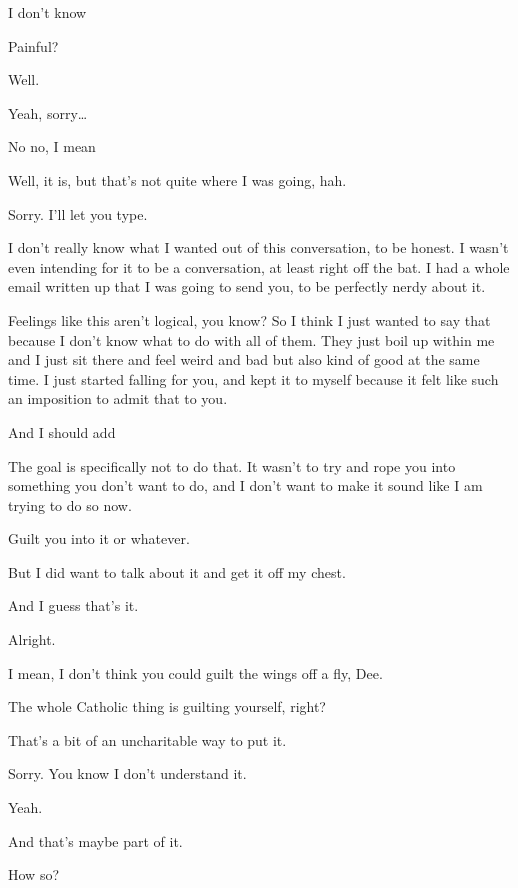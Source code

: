  I don't know

 Painful?

 Well.

 Yeah, sorry\ldots{}

 No no, I mean

 Well, it is, but that's not quite where I was going, hah.

 Sorry. I'll let you type.

 I don't really know what I wanted out of this conversation, to be honest. I wasn't even intending for it to be a conversation, at least right off the bat. I had a whole email written up that I was going to send you, to be perfectly nerdy about it.

 Feelings like this aren't logical, you know? So I think I just wanted to say that because I don't know what to do with all of them. They just boil up within me and I just sit there and feel weird and bad but also kind of good at the same time. I just started falling for you, and kept it to myself because it felt like such an imposition to admit that to you.

 And I should add

 The goal is specifically not to do that. It wasn't to try and rope you into something you don't want to do, and I don't want to make it sound like I am trying to do so now.

 Guilt you into it or whatever.

 But I did want to talk about it and get it off my chest.

 And I guess that's it.

 Alright.

 I mean, I don't think you could guilt the wings off a fly, Dee.

 The whole Catholic thing is guilting yourself, right?

 That's a bit of an uncharitable way to put it.

 Sorry. You know I don't understand it.

 Yeah.

 And that's maybe part of it.

 How so?


